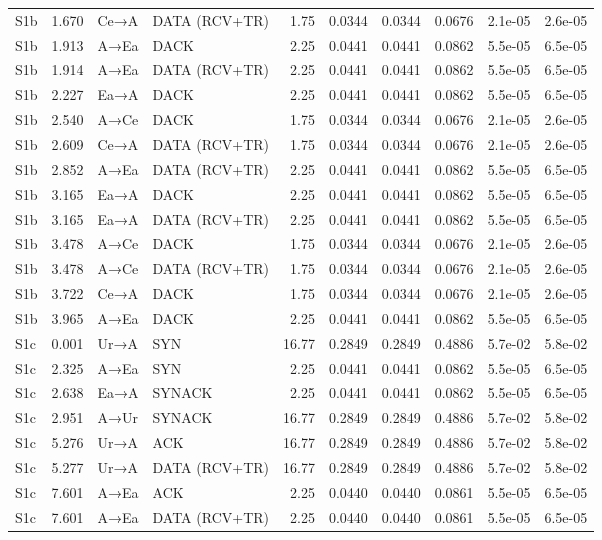 \documentclass[10pt,letterpaper]{article}
\begin{document}
{\begin{longtable}{@{}lrllrrrrrr@{}}
S1b & 1.670 & Ce→A & DATA (RCV+TR) & 1.75 & 0.0344 & 0.0344 & 0.0676 & 2.1e-05 & 2.6e-05 \\
S1b & 1.913 & A→Ea & DACK & 2.25 & 0.0441 & 0.0441 & 0.0862 & 5.5e-05 & 6.5e-05 \\
S1b & 1.914 & A→Ea & DATA (RCV+TR) & 2.25 & 0.0441 & 0.0441 & 0.0862 & 5.5e-05 & 6.5e-05 \\
S1b & 2.227 & Ea→A & DACK & 2.25 & 0.0441 & 0.0441 & 0.0862 & 5.5e-05 & 6.5e-05 \\
S1b & 2.540 & A→Ce & DACK & 1.75 & 0.0344 & 0.0344 & 0.0676 & 2.1e-05 & 2.6e-05 \\
S1b & 2.609 & Ce→A & DATA (RCV+TR) & 1.75 & 0.0344 & 0.0344 & 0.0676 & 2.1e-05 & 2.6e-05 \\
S1b & 2.852 & A→Ea & DATA (RCV+TR) & 2.25 & 0.0441 & 0.0441 & 0.0862 & 5.5e-05 & 6.5e-05 \\
S1b & 3.165 & Ea→A & DACK & 2.25 & 0.0441 & 0.0441 & 0.0862 & 5.5e-05 & 6.5e-05 \\
S1b & 3.165 & Ea→A & DATA (RCV+TR) & 2.25 & 0.0441 & 0.0441 & 0.0862 & 5.5e-05 & 6.5e-05 \\
S1b & 3.478 & A→Ce & DACK & 1.75 & 0.0344 & 0.0344 & 0.0676 & 2.1e-05 & 2.6e-05 \\
S1b & 3.478 & A→Ce & DATA (RCV+TR) & 1.75 & 0.0344 & 0.0344 & 0.0676 & 2.1e-05 & 2.6e-05 \\
S1b & 3.722 & Ce→A & DACK & 1.75 & 0.0344 & 0.0344 & 0.0676 & 2.1e-05 & 2.6e-05 \\
S1b & 3.965 & A→Ea & DACK & 2.25 & 0.0441 & 0.0441 & 0.0862 & 5.5e-05 & 6.5e-05 \\
S1c & 0.001 & Ur→A & SYN & 16.77 & 0.2849 & 0.2849 & 0.4886 & 5.7e-02 & 5.8e-02 \\
S1c & 2.325 & A→Ea & SYN & 2.25 & 0.0441 & 0.0441 & 0.0862 & 5.5e-05 & 6.5e-05 \\
S1c & 2.638 & Ea→A & SYNACK & 2.25 & 0.0441 & 0.0441 & 0.0862 & 5.5e-05 & 6.5e-05 \\
S1c & 2.951 & A→Ur & SYNACK & 16.77 & 0.2849 & 0.2849 & 0.4886 & 5.7e-02 & 5.8e-02 \\
S1c & 5.276 & Ur→A & ACK & 16.77 & 0.2849 & 0.2849 & 0.4886 & 5.7e-02 & 5.8e-02 \\
S1c & 5.277 & Ur→A & DATA (RCV+TR) & 16.77 & 0.2849 & 0.2849 & 0.4886 & 5.7e-02 & 5.8e-02 \\
S1c & 7.601 & A→Ea & ACK & 2.25 & 0.0440 & 0.0440 & 0.0861 & 5.5e-05 & 6.5e-05 \\
S1c & 7.601 & A→Ea & DATA (RCV+TR) & 2.25 & 0.0440 & 0.0440 & 0.0861 & 5.5e-05 & 6.5e-05 \\

\end{longtable}}
\end{document}
